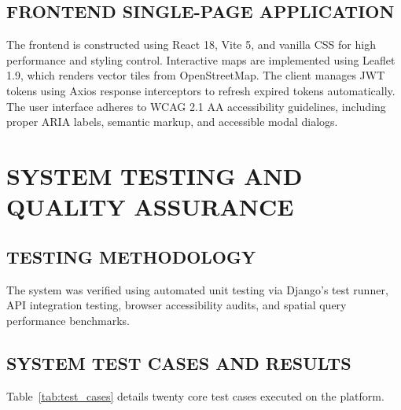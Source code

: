 \documentclass[12pt,a4paper]{report}
\begin{document}
\section{FRONTEND SINGLE-PAGE APPLICATION}
The frontend is constructed using React 18, Vite 5, and vanilla CSS for high performance and styling control. Interactive maps are implemented using Leaflet 1.9, which renders vector tiles from OpenStreetMap. The client manages JWT tokens using Axios response interceptors to refresh expired tokens automatically. The user interface adheres to WCAG 2.1 AA accessibility guidelines, including proper ARIA labels, semantic markup, and accessible modal dialogs.

\newpage
\chapter{SYSTEM TESTING AND QUALITY ASSURANCE}

\section{TESTING METHODOLOGY}
The system was verified using automated unit testing via Django's test runner, API integration testing, browser accessibility audits, and spatial query performance benchmarks.

\section{SYSTEM TEST CASES AND RESULTS}
Table~\ref{tab:test_cases} details twenty core test cases executed on the platform.
\end{document}
